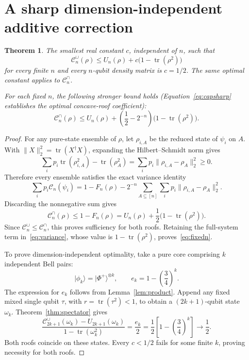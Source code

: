 \documentclass[11pt,a4paper]{article}
\newtheorem{theorem}{Theorem}
\newcommand{\tr}{\operatorname{tr}}
\newcommand{\CE}{\mathcal C}
\newcommand{\ket}[1]{\lvert #1\rangle}
\begin{document}
\section{A sharp dimension-independent additive correction}
\begin{theorem}\label{thm:repair}
The smallest real constant $c$, independent of $n$, such that
\begin{equation}\label{eq:repair}
 \CE_n^\cup(\rho)\leq U_n(\rho)+c\bigl(1-\tr(\rho^2)\bigr)
\end{equation}
for every finite $n$ and every $n$-qubit density matrix is $c=1/2$. The same optimal constant applies to $\CE_n^\cap$.

For each fixed $n$, the following stronger bound holds (Equation~\eqref{eq:capsharp} establishes the optimal concave-roof coefficient):
\begin{equation}\label{eq:fixedn}
 \CE_n^\cap(\rho)\leq U_n(\rho)
       +\left(\frac12-2^{-n}\right)\bigl(1-\tr(\rho^2)\bigr).
\end{equation}
\end{theorem}
\begin{proof}
For any pure-state ensemble of $\rho$, let $\rho_{i,A}$ be the reduced state of $\psi_i$ on $A$. With $\|X\|_2^2=\tr(X^\dagger X)$, expanding the Hilbert--Schmidt norm gives
\[
 \sum_i p_i\tr(\rho_{i,A}^2)-\tr(\rho_A^2)
       =\sum_i p_i\|\rho_{i,A}-\rho_A\|_2^2\geq0.
\]
Therefore every ensemble satisfies the exact variance identity
\begin{equation}\label{eq:variance}
 \sum_i p_i\CE_n(\psi_i)
 =1-F_n(\rho)-2^{-n}\sum_{A\subseteq[n]}\sum_i p_i
                         \|\rho_{i,A}-\rho_A\|_2^2.
\end{equation}
Discarding the nonnegative sum gives
\[
 \CE_n^\cap(\rho)\leq1-F_n(\rho)
       =U_n(\rho)+\frac12\bigl(1-\tr(\rho^2)\bigr).
\]
Since $\CE_n^\cup\leq\CE_n^\cap$, this proves sufficiency for both roofs. Retaining the full-system term in~\eqref{eq:variance}, whose value is $1-\tr(\rho^2)$, proves~\eqref{eq:fixedn}.

To prove dimension-independent optimality, take a pure core comprising $k$ independent Bell pairs:
\[
 \ket{\phi_k}=\ket{\Phi^+}^{\otimes k},\qquad
 e_k=1-\left(\frac34\right)^k.
\]
The expression for $e_k$ follows from Lemma~\ref{lem:product}. Append any fixed mixed single qubit $\tau$, with $r=\tr(\tau^2)<1$, to obtain a $(2k+1)$-qubit state $\omega_k$. Theorem~\ref{thm:spectator} gives
\[
 \frac{\CE_{2k+1}^\cup(\omega_k)-U_{2k+1}(\omega_k)}
 {1-\tr(\omega_k^2)}
 =\frac{e_k}{2}
 =\frac12\left[1-\left(\frac34\right)^k\right]
 \longrightarrow\frac12.
\]
Both roofs coincide on these states. Every $c<1/2$ fails for some finite $k$, proving necessity for both roofs.
\end{proof}
\end{document}
